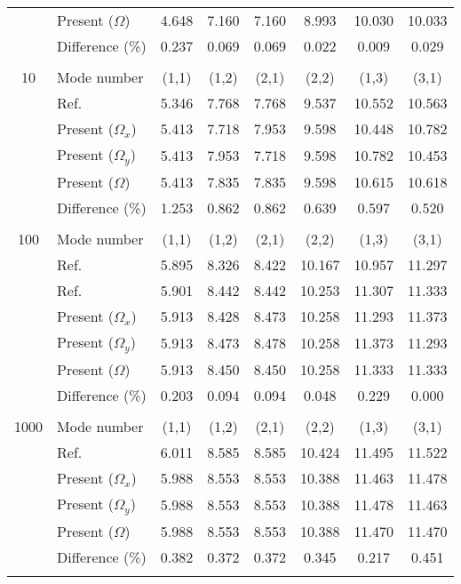 \documentclass[preprint,12pt,number]{elsarticle}
\begin{document}
\begin{table}[!htbp]
\begin{tabular}{c l c c c c c c}
	\\ 
	& Present ($\Omega$)   & 4.648      & 7.160   & 7.160     & 8.993    &   10.030   & 10.033   \\
	&Difference (\%)& 0.237    & 0.069      & 0.069      & 0.022     &  0.009     &0.029
	\\
	\\
	10 & Mode number   &  (1,1) & (1,2) & (2,1) & (2,2) & (1,3) & (3,1) \\
	& Ref.\Citealp{zhang2019new}  & 5.346 & 7.768 & 7.768 & 9.537 & 10.552 & 10.563 \\
	& Present ($\Omega_x$)   & 5.413      & 7.718      & 7.953     & 9.598     & 10.448      & 10.782 \\
	& Present ($\Omega_y$)   & 5.413     & 7.953     & 7.718      & 9.598    & 10.782      & 10.453
	\\ 
	& Present ($\Omega$)   &5.413      & 7.835     & 7.835     & 9.598   &  10.615    & 10.618  \\
	&Difference (\%)& 1.253     & 0.862      & 0.862      & 0.639     &  0.597     & 0.520  \\
	\\
	100 & Mode number   &  (1,1) & (1,2) & (2,1) & (2,2) & (1,3) & (3,1) \\
	& Ref.\Citealp{mukhopadhyay1979free} & 5.895& 8.326 &8.422 &10.167 &10.957 &11.297 \\
	& Ref.\Citealp{zhang2019new} & 5.901 & 8.442 & 8.442 & 10.253 & 11.307 & 11.333 \\
	& Present ($\Omega_x$)   & 5.913     & 8.428      & 8.473    & 10.258     & 11.293      & 11.373 \\
	& Present ($\Omega_y$)   & 5.913    & 8.473     & 8.478    & 10.258     & 11.373     & 11.293
	\\ 
	& Present ($\Omega$)   & 5.913     & 8.450     & 8.450     & 10.258     &  11.333    & 11.333  \\
	&Difference (\%)& 0.203     & 0.094      & 0.094      & 0.048     & 0.229     & 0.000 \\
	\\
	1000 & Mode number   & (1,1) & (1,2) & (2,1) & (2,2) & (1,3) & (3,1) \\
	& Ref.\Citealp{zhang2019new} & 6.011 & 8.585 & 8.585 & 10.424 & 11.495 & 11.522 \\
	& Present ($\Omega_x$)   & 5.988     & 8.553      & 8.553      & 10.388      & 11.463      & 11.478 \\
	& Present ($\Omega_y$)   & 5.988     & 8.553     & 8.553    & 10.388      & 11.478       & 11.463
	\\ 
	& Present ($\Omega$)   & 5.988      & 8.553    & 8.553     & 10.388    &  11.470     & 11.470  \\
	&Difference (\%)& 0.382    & 0.372      & 0.372      & 0.345     &  0.217     & 0.451
	\\
	\\
	\bottomrule
\end{tabular}
\label{tab:rot1}
\end{table}
\end{document}
